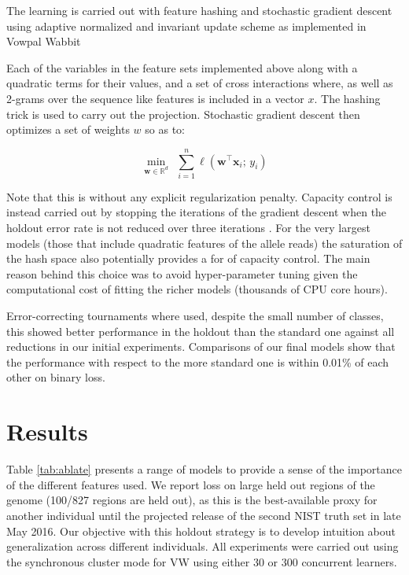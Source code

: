 \documentclass{article}
\newcommand{\w}{\mathbf{w}}
\newcommand{\x}{\mathbf{x}}
\newcommand{\R}{\mathbb{R}}
\newcommand{\tr}{{\!\top}}
\begin{document}
The learning is carried out with feature hashing and stochastic gradient descent using adaptive normalized and invariant update scheme as implemented in Vowpal Wabbit \cite{mcmahan2010adaptive, duchi2011adaptive, agarwal2014reliable}

Each of the variables in the feature sets implemented above along with a quadratic terms for their values, and a set of cross interactions where, as well as 2-grams over the sequence like features  is included in a vector $x$.
The hashing trick is used to carry out the projection.
Stochastic gradient descent then optimizes a set of weights $w$ so as to:

\begin{equation}
  \min_{\w \in \R^d}~~\sum_{i=1}^n\ell(\w^\tr\x_i;\,y_i)
  \label{eqn:objective}
\end{equation}

Note that this is without any explicit regularization penalty.
Capacity control is instead carried out by stopping the iterations of the gradient descent when the holdout error rate is not reduced over three iterations \citep{hardt2015train}.
For the very largest models (those that include quadratic features of the allele reads) the saturation of the hash space also potentially provides a for of capacity control.
The main reason behind this choice was to avoid hyper-parameter tuning given the computational cost of fitting the richer models (thousands of CPU core hours).

Error-correcting tournaments \citep{beygelzimer2009error} where used,  despite the small number of classes, this showed better performance in the holdout than the standard one against all reductions in our initial experiments.
Comparisons of our final models show that the performance with respect to the more standard one is within 0.01\% of each other on binary loss.



\section{Results}

Table \ref{tab:ablate} presents a range of models to provide a sense of the importance of the different features used.
We report loss on large held out regions of the genome (100/827 regions are held out), as this is the best-available proxy for another individual until the projected release of the second NIST truth set in late May 2016.
Our objective with this holdout strategy is to develop intuition about generalization across different individuals.
All experiments were carried out using the synchronous cluster mode for VW using either 30 or 300 concurrent learners.
\end{document}

